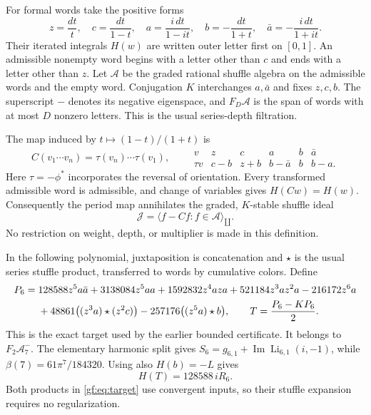\documentclass[11pt,a4paper]{article}
\numberwithin{equation}{section}
\theoremstyle{definition}
\theoremstyle{remark}
\providecommand{\shuffle}{\mathbin{\amalg}}
\begin{document}
For formal words take the positive forms
\[
 z=\frac{dt}{t},\quad c=\frac{dt}{1-t},\quad
 a=\frac{i\,dt}{1-it},\quad b=-\frac{dt}{1+t},\quad
 \bar a=-\frac{i\,dt}{1+it}.
\]
Their iterated integrals $H(w)$ are written outer letter first on $[0,1]$.
An admissible nonempty word begins with a letter other than $c$ and ends
with a letter other than $z$. Let $\mathcal A$ be the graded rational
shuffle algebra on the admissible words and the empty word. Conjugation
$K$ interchanges $a,\bar a$ and fixes $z,c,b$. The superscript $-$ denotes
its negative eigenspace, and $F_D\mathcal A$ is the span of words with
at most $D$ nonzero letters. This is the usual series-depth filtration.

The map induced by $t\mapsto(1-t)/(1+t)$ is
\[
 C(v_1\cdots v_n)=\tau(v_n)\cdots\tau(v_1),\qquad
 \begin{array}{c|ccccc}
 v&z&c&a&b&\bar a\\ \hline
 \tau v&c-b&z+b&b-\bar a&b&b-a.
 \end{array}
\]
Here $\tau=-\phi^*$ incorporates the reversal of orientation. Every
transformed admissible word is admissible, and change of variables gives
$H(Cw)=H(w)$. Consequently the period map annihilates the graded,
$K$-stable shuffle ideal
\begin{equation}
 \mathcal J=\langle f-Cf:f\in\mathcal A\rangle_{\shuffle}.
 \label{gf:eq:ideal}
\end{equation}
No restriction on weight, depth, or multiplier is made in this definition.

In the following polynomial, juxtaposition is concatenation and $\star$
is the usual series stuffle product, transferred to words by cumulative
colors. Define
\begin{align}
 P_6={}&128588z^5a\bar a+3138084z^5aa
          +1592832z^4aza+521184z^3az^2a-216172z^6a\notag\\
       &+48861\bigl((z^3a)\star(z^2c)\bigr)
          -257176\bigl((z^5a)\star b\bigr),\qquad
 T=\frac{P_6-KP_6}{2}.
 \label{gf:eq:target}
\end{align}
This is the exact target used by the earlier bounded certificate.
It belongs to $F_2\mathcal A_7^-$. The elementary harmonic split gives
$S_6=g_{6,1}+\operatorname{Im}\operatorname{Li}_{6,1}(i,-1)$, while
$\beta(7)=61\pi^7/184320$. Using also $H(b)=-L$ gives
\begin{equation}
 H(T)=128588\,iR_6.
 \label{gf:eq:target-value}
\end{equation}
Both products in \eqref{gf:eq:target} use convergent inputs, so their
stuffle expansion requires no regularization.
\end{document}
